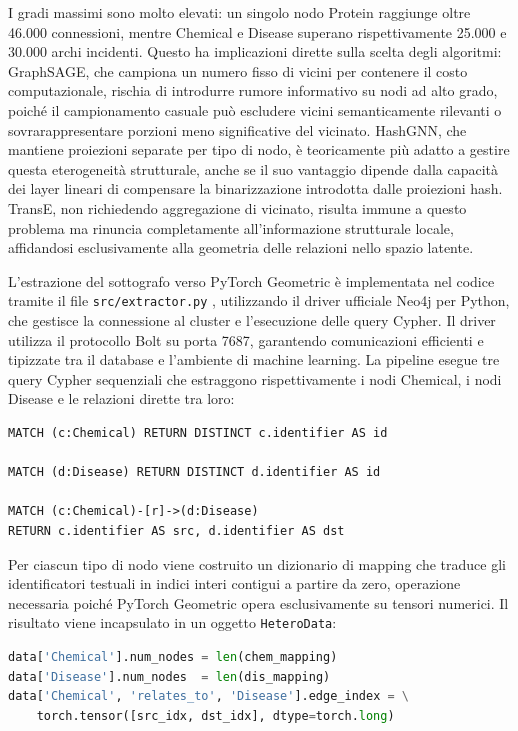 I gradi massimi sono molto elevati: un singolo nodo Protein raggiunge oltre 46.000 connessioni, mentre Chemical e Disease superano rispettivamente 25.000 e 30.000 archi incidenti. Questo ha implicazioni dirette sulla scelta degli algoritmi: GraphSAGE, che campiona un numero fisso di vicini per contenere il costo computazionale, rischia di introdurre rumore informativo su nodi ad alto grado, poiché il campionamento casuale può escludere vicini semanticamente rilevanti o sovrarappresentare porzioni meno significative del vicinato. HashGNN, che mantiene proiezioni separate per tipo di nodo, è teoricamente più adatto a gestire questa eterogeneità strutturale, anche se il suo vantaggio dipende dalla capacità dei layer lineari di compensare la binarizzazione introdotta dalle proiezioni hash. TransE, non richiedendo aggregazione di vicinato, risulta immune a questo problema ma rinuncia completamente all'informazione strutturale locale, affidandosi esclusivamente alla geometria delle relazioni nello spazio latente.

L'estrazione del sottografo verso PyTorch Geometric \cite{fey2019fast} è implementata nel codice tramite il file \texttt{src/extractor.py} , utilizzando il driver ufficiale Neo4j per Python, che gestisce la  connessione al cluster e l'esecuzione delle query Cypher. Il driver utilizza il protocollo Bolt su porta 7687, garantendo comunicazioni efficienti e tipizzate tra il database e l'ambiente di machine learning. La pipeline esegue tre query Cypher sequenziali che estraggono rispettivamente i nodi Chemical, i nodi Disease e le relazioni dirette tra loro:

\begin{lstlisting}[language=Cypher, caption={Query di estrazione del sottografo Chemical$\to$Disease}]
MATCH (c:Chemical) RETURN DISTINCT c.identifier AS id

MATCH (d:Disease) RETURN DISTINCT d.identifier AS id

MATCH (c:Chemical)-[r]->(d:Disease)
RETURN c.identifier AS src, d.identifier AS dst
\end{lstlisting}

Per ciascun tipo di nodo viene costruito un dizionario di mapping che traduce gli identificatori testuali in indici interi contigui a partire da zero, operazione necessaria poiché PyTorch Geometric opera esclusivamente su tensori numerici. Il risultato viene incapsulato in un oggetto \texttt{HeteroData}:

\begin{lstlisting}[language=Python, caption={Costruzione dell'oggetto HeteroData per PyTorch Geometric}]
data['Chemical'].num_nodes = len(chem_mapping)
data['Disease'].num_nodes  = len(dis_mapping)
data['Chemical', 'relates_to', 'Disease'].edge_index = \
    torch.tensor([src_idx, dst_idx], dtype=torch.long)
\end{lstlisting}

